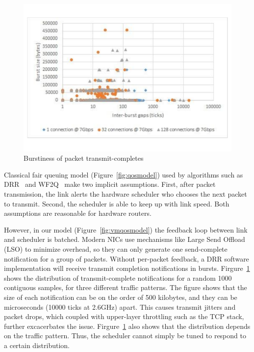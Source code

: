 \begin{figure}
\centering
\includegraphics[width=\columnwidth, trim=60pt 20mm 0pt 8mm]{figures/completesburst}
\caption{Burstiness of packet transmit-completes}
\label{completesburst}
\vspace{-3mm}
\end{figure}

Classical fair queuing model (Figure~\ref{fig:qosmodel}) used by algorithms such
as DRR~\cite{drr} and WF2Q~\cite{wf2q} make two implicit assumptions. First,
after packet transmission, the link alerts the hardware scheduler who chooses the
next packet to transmit. Second, the scheduler is able to keep up with link
speed.  Both assumptions are reasonable for hardware routers.

However, in our model  (Figure~\ref{fig:vmqosmodel}) the feedback loop between
link and scheduler is batched.  Modern NICs use mechanisms like Large Send
Offload (LSO) to minimize overhead, so they can only generate one send-complete
notification for a group of packets.  Without per-packet feedback, a DRR
software implementation will receive transmit completion notifications in
bursts. Firgure~\ref{completesburst} shows the distribution of transmit-complete
notifications for a random 1000 contiguous samples, for three different traffic patterns.
The figure shows that the size of each notification can be on the order
of 500 kilobytes, and they can be microseconds (10000 ticks at 2.6GHz) apart. This causes transmit
jitters and packet drops, which coupled with upper-layer throttling such as the TCP
stack, further excacerbates the issue.  Firgure~\ref{completesburst} also shows that 
the distribution depends on the traffic pattern. Thus, the scheduler cannot
simply be tuned to respond to a certain distribution.

